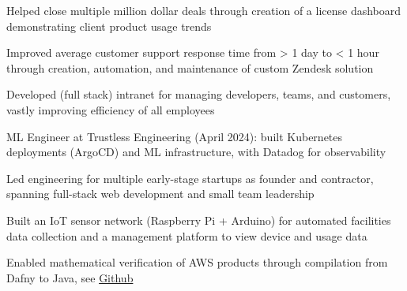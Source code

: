 \documentclass[print]{jack-resume}
\begin{document}
\begin{tightemize}
    \item Helped close multiple million dollar deals through creation of a license dashboard demonstrating client product usage trends
    \item Improved average customer support response time from > 1 day to < 1 hour through creation, automation, and maintenance of custom Zendesk solution
    \item Developed (full stack) intranet for managing developers, teams, and customers, vastly improving efficiency of all employees
\end{tightemize}
\sectionsep

\begin{tightemize}
    \item ML Engineer at Trustless Engineering (April 2024): built Kubernetes deployments (ArgoCD) and ML infrastructure, with Datadog for observability
    \item Led engineering for multiple early-stage startups as founder and contractor, spanning full-stack web development and small team leadership
\end{tightemize}
\sectionsep

\begin{tightemize}
    \item Built an IoT sensor network (Raspberry Pi + Arduino) for automated facilities data collection and a management platform to view device and usage data
\end{tightemize}

\begin{tightemize}
    \item Enabled mathematical verification of AWS products through compilation from Dafny to Java, see \href{https://github.com/dafny-lang/dafny}{Github \ExternalLink}
\end{tightemize}
\sectionsep
\end{document}
